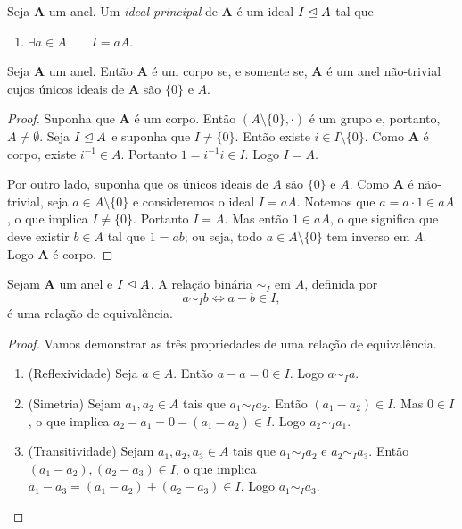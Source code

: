 \begin{defi}
	Seja $\bm A$ um anel. Um \emph{ideal principal} de $\bm A$ é um ideal $I \mathrel{\unlhd} A$ tal que
	\begin{enumerate}
	\item $\exists a \in A \qquad I=aA$.
	\end{enumerate}
\end{defi}

\begin{prop}
\label{pro:corp.sse.ide}
	Seja $\bm A$ um anel. Então $\bm A$ é um corpo se, e somente se, $\bm A$ é um anel não-trivial cujos únicos ideais de $\bm A$ são $\{0\}$ e $A$.
\end{prop}
\begin{proof}
	Suponha que $\bm A$ é um corpo. Então $(A\setminus\{0\},\cdot)$ é um grupo e, portanto, $A \neq \emptyset$. Seja $I \mathrel{\unlhd} A$ e suponha que $I \neq \{0\}$. Então existe $i \in I\setminus\{0\}$. Como $\bm A$ é corpo, existe $i^{-1} \in A$. Portanto $1=i^{-1}i \in I$. Logo $I=A$.

	Por outro lado, suponha que os únicos ideais de $A$ são $\{0\}$ e $A$. Como $\bm A$ é não-trivial, seja $a \in A\setminus\{0\}$ e consideremos o ideal $I=aA$. Notemos que $a=a \cdot 1 \in aA$, o que implica $I \neq \{0\}$. Portanto $I=A$. Mas então $1 \in aA$, o que significa que deve existir $b \in A$ tal que $1=ab$; ou seja, todo $a \in A\setminus\{0\}$ tem inverso em $A$. Logo $\bm A$ é corpo.
\end{proof}

\begin{prop}
	Sejam $\bm A$ um anel e $I \mathrel{\unlhd} A$. A relação binária $\sim_I$ em $A$, definida por
	\begin{equation*}
	a \sim_I b \Leftrightarrow a-b \in I,
	\end{equation*}
é uma relação de equivalência.
\end{prop}
\begin{proof} Vamos demonstrar as três propriedades de uma relação de equivalência.
	\begin{enumerate}
	\item (Reflexividade) Seja $a \in A$. Então $a-a=0 \in I$. Logo $a \sim_I a$.
	\item (Simetria) Sejam $a_1,a_2 \in A$ tais que $a_1 \sim_I a_2$. Então $(a_1-a_2) \in I$. Mas $0 \in I$, o que implica $a_2-a_1 = 0-(a_1-a_2) \in I$. Logo $a_2 \sim_I a_1$.
	\item (Transitividade) Sejam $a_1,a_2,a_3 \in A$ tais que $a_1 \sim_I a_2$ e $a_2 \sim_I a_3$. Então $(a_1-a_2),(a_2-a_3) \in I$, o que implica $a_1-a_3=(a_1-a_2)+(a_2-a_3) \in I$. Logo $a_1 \sim_I a_3$.
	\end{enumerate}
\end{proof}


